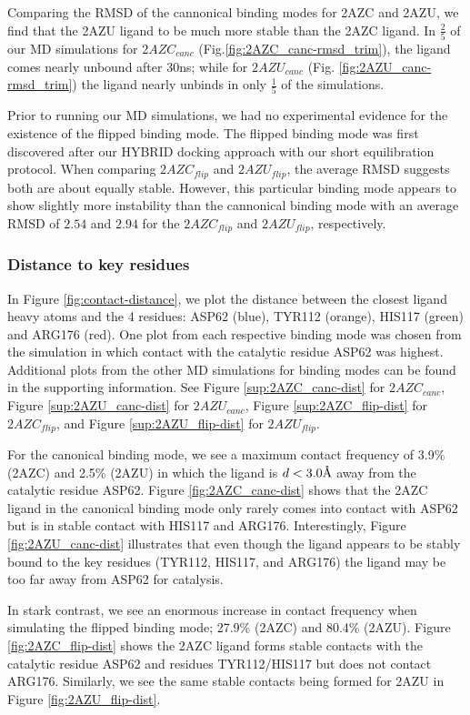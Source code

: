 \documentclass[fleqn,10pt]{wlscirep}
\newcommand{\angstrom}{\text{\normalfont\AA}}
\begin{document}
Comparing the RMSD of the cannonical binding modes for 2AZC and 2AZU, we find that the 2AZU ligand to be much more stable than the 2AZC ligand.
In $\frac{2}{5}$ of our MD simulations for $2AZC_{canc}$ (Fig.\ref{fig:2AZC_canc-rmsd_trim}), the ligand comes nearly unbound after 30ns; while for $2AZU_{canc}$ (Fig. \ref{fig:2AZU_canc-rmsd_trim}) the ligand nearly unbinds in only $\frac{1}{5}$ of the simulations.

Prior to running our MD simulations, we had no experimental evidence for the existence of the flipped binding mode.
The flipped binding mode was first discovered after our HYBRID docking approach with our short equilibration protocol.
When comparing $2AZC_{flip}$ and $2AZU_{flip}$, the average RMSD suggests both are about equally stable.
However, this particular binding mode appears to show slightly more instability than the cannonical binding mode with an average RMSD of $2.54$ and $2.94$ for the $2AZC_{flip}$ and $2AZU_{flip}$, respectively.

\subsubsection{Distance to key residues}

In Figure \ref{fig:contact-distance}, we plot the distance between the closest ligand heavy atoms and the 4 residues: ASP62 (blue), TYR112 (orange), HIS117 (green) and ARG176 (red).
One plot from each respective binding mode was chosen from the simulation in which contact with the catalytic residue ASP62 was highest.
Additional plots from the other MD simulations for binding modes can be found in the supporting information.
See Figure \ref{sup:2AZC_canc-dist} for $2AZC_{canc}$, Figure \ref{sup:2AZU_canc-dist} for $2AZU_{canc}$, Figure \ref{sup:2AZC_flip-dist} for $2AZC_{flip}$, and Figure \ref{sup:2AZU_flip-dist} for $2AZU_{flip}$.

For the canonical binding mode, we see a maximum contact frequency of 3.9\% (2AZC) and 2.5\% (2AZU) in which the ligand is $d<3.0\angstrom$ away from the catalytic residue ASP62.
Figure \ref{fig:2AZC_canc-dist} shows that the 2AZC ligand in the canonical binding mode only rarely comes into contact with ASP62 but is in stable contact with HIS117 and ARG176.  
Interestingly, Figure \ref{fig:2AZU_canc-dist} illustrates that even though the ligand appears to be stably bound to the key residues (TYR112, HIS117, and ARG176) the ligand may be too far away from ASP62 for catalysis.

In stark contrast, we see an enormous increase in contact frequency when simulating the flipped binding mode; 27.9\% (2AZC) and 80.4\% (2AZU).
Figure \ref{fig:2AZC_flip-dist} shows the 2AZC ligand forms stable contacts with the catalytic residue ASP62 and residues TYR112/HIS117 but does not contact ARG176.
Similarly, we see the same stable contacts being formed for 2AZU in Figure \ref{fig:2AZU_flip-dist}.
\end{document}
